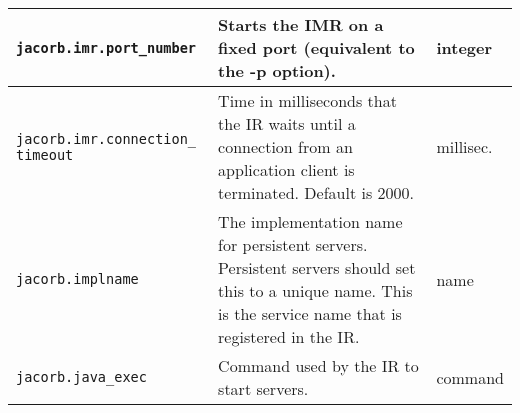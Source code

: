 \begin{small}
\begin{longtable}{|p{5cm}|p{9cm}|p{2cm}|}
\hline
\verb"jacorb.imr.port_number" & Starts the IMR on a fixed port (equivalent to the -p option). & integer \\
\hline
\verb"jacorb.imr.connection_"
\verb"timeout" & Time in milliseconds that the IR waits until a connection from an application client is terminated. Default is 2000. & millisec. \\
\hline
\verb"jacorb.implname" & The implementation name for persistent servers. Persistent servers should set this to a unique name. This is the service name that is registered in the IR. & name \\
\hline
\verb"jacorb.java_exec" & Command used by the IR to start servers. & command \\
\hline

\end{longtable}
\end{small}


